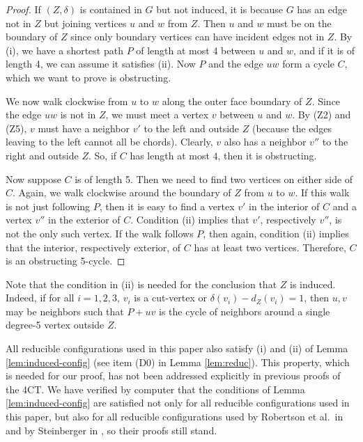\documentclass[10pt,a4paper]{article}
\begin{document}
\begin{proof}
   If $(Z,\delta)$ is contained in $G$ but not induced, it is because $G$ has an edge not in $Z$ but joining vertices $u$ and $w$ from $Z$. Then $u$ and $w$ must be on the boundary of $Z$ since only boundary vertices can have incident edges not in $Z$. By (i), we have a shortest path $P$ of length at most 4 between $u$ and $w$, and if it is of length 4, we can assume it satisfies (ii). Now $P$ and the edge $uw$ form a cycle $C$, which we want to prove is obstructing.

   We now walk clockwise from $u$ to $w$ along the outer face boundary of $Z$. Since the edge $uw$
   is not in $Z$, we must meet a vertex $v$ between $u$ and $w$. By (Z2) and (Z5), $v$ must have a neighbor $v'$ to the left and outside $Z$ (because the edges leaving to the left cannot all be chords). Clearly,
   $v$ also has a neighbor $v''$ to the right and outside $Z$.
   So, if $C$ has length at most $4$, then it is obstructing.

   Now suppose $C$ is of length 5. Then we need to find two vertices on either side of $C$. Again, we walk clockwise around the boundary of $Z$ from $u$ to $w$. If this walk is not just following $P$, then
   it is easy to find a vertex $v'$ in the interior of $C$ and a vertex $v''$ in the exterior of $C$. Condition (ii) implies that $v'$, respectively $v''$, is not the only such vertex. If the walk follows $P$, then again, condition (ii) implies that the interior, respectively exterior, of $C$ has at least two vertices.
   Therefore, $C$ is an obstructing 5-cycle.
\end{proof}

Note that the condition in (ii) is needed for the conclusion that $Z$ is induced. Indeed, if for all $i=1,2,3$, $v_i$ is a cut-vertex or $\delta(v_i)-d_Z(v_i)= 1$, then $u,v$ may be neighbors such that $P+uv$ is the cycle of neighbors around a single degree-5 vertex outside $Z$.


All reducible configurations used in this paper also satisfy (i) and (ii) of Lemma \ref{lem:induced-config} (see item (D0) in Lemma \ref{lem:reduc}). This property, which is needed for 
our proof, has not been addressed explicitly in previous proofs of the 4CT.
We have verified by computer that the conditions of Lemma \ref{lem:induced-config} are satisfied not only for all reducible configurations used in this paper, but also for all reducible configurations used by Robertson et al.\ in \cite{RSST} and by Steinberger in \cite{steinberger2010unavoidable}, so their proofs still stand. 
\end{document}
